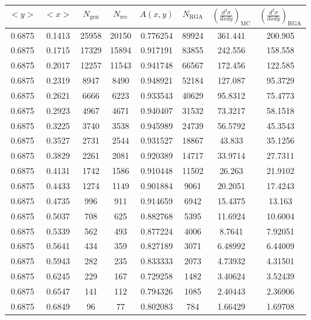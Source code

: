 \begin{table}[h!]
	\centering
	\begin{tabular}{ |c|c|c|c|c|c|c|c| } 
		\hline
		$<y>$ & $<x>$ & $N_{\mathrm{gen}}$ & $N_{\mathrm{rec}}$ & $A(x,y)$ & $N_{\mathrm{RGA}}$ & $\left( \frac{d^2\sigma}{dxdy} \right)_{\mathrm{MC}}$ & $\left( \frac{d^2\sigma}{dxdy} \right)_{\mathrm{RGA}}$ \\
		\hline
		0.6875 & 0.1413 & 25958 & 20150 & 0.776254 & 89924 & 361.441 & 200.905 \\ 
		0.6875 & 0.1715 & 17329 & 15894 & 0.917191 & 83855 & 242.556 & 158.558 \\ 
		0.6875 & 0.2017 & 12257 & 11543 & 0.941748 & 66567 & 172.456 & 122.585 \\ 
		0.6875 & 0.2319 & 8947 & 8490 & 0.948921 & 52184 & 127.087 & 95.3729 \\ 
		0.6875 & 0.2621 & 6666 & 6223 & 0.933543 & 40629 & 95.8312 & 75.4773 \\ 
		0.6875 & 0.2923 & 4967 & 4671 & 0.940407 & 31532 & 73.3217 & 58.1518 \\ 
		0.6875 & 0.3225 & 3740 & 3538 & 0.945989 & 24739 & 56.5792 & 45.3543 \\ 
		0.6875 & 0.3527 & 2731 & 2544 & 0.931527 & 18867 & 43.833 & 35.1256 \\ 
		0.6875 & 0.3829 & 2261 & 2081 & 0.920389 & 14717 & 33.9714 & 27.7311 \\ 
		0.6875 & 0.4131 & 1742 & 1586 & 0.910448 & 11502 & 26.263 & 21.9102 \\ 
		0.6875 & 0.4433 & 1274 & 1149 & 0.901884 & 9061 & 20.2051 & 17.4243 \\ 
		0.6875 & 0.4735 & 996 & 911 & 0.914659 & 6942 & 15.4375 & 13.163 \\ 
		0.6875 & 0.5037 & 708 & 625 & 0.882768 & 5395 & 11.6924 & 10.6004 \\ 
		0.6875 & 0.5339 & 562 & 493 & 0.877224 & 4006 & 8.7641 & 7.92051 \\ 
		0.6875 & 0.5641 & 434 & 359 & 0.827189 & 3071 & 6.48992 & 6.44009 \\ 
		0.6875 & 0.5943 & 282 & 235 & 0.833333 & 2073 & 4.73932 & 4.31501 \\ 
		0.6875 & 0.6245 & 229 & 167 & 0.729258 & 1482 & 3.40624 & 3.52439 \\ 
		0.6875 & 0.6547 & 141 & 112 & 0.794326 & 1085 & 2.40443 & 2.36906 \\ 
		0.6875 & 0.6849 & 96 & 77 & 0.802083 & 784 & 1.66429 & 1.69708 \\ 
		\hline
	\end{tabular}
\end{table}

